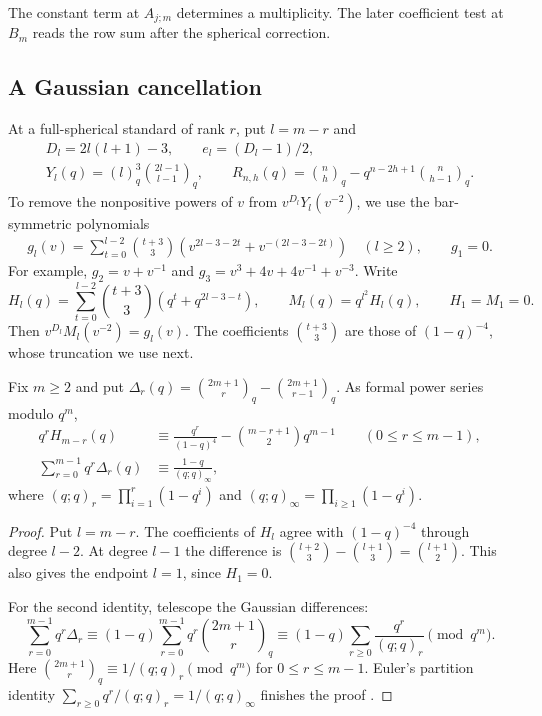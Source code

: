 \documentclass[a4paper,11pt]{amsart}
\numberwithin{equation}{subsection}
\theoremstyle{plain}
\theoremstyle{definition}
\theoremstyle{remark}
\newcommand{\gbinom}[2]{\binom{#1}{#2}}
\begin{document}
The constant term at $A_{j;m}$ determines a multiplicity.
The later coefficient test at $B_m$ reads the row sum after the
spherical correction.

\subsection{A Gaussian cancellation}

At a full-spherical standard of rank $r$, put $l=m-r$ and
\[
\begin{gathered}
D_l=2l(l+1)-3,\qquad e_l=(D_l-1)/2,\\
Y_l(q)=(l)_q^3\gbinom{2l-1}{l-1}_q,\qquad
R_{n,h}(q)=\gbinom{n}{h}_q-q^{n-2h+1}\gbinom{n}{h-1}_q.
\end{gathered}
\]
To remove the nonpositive powers of $v$ from
$v^{D_l}Y_l(v^{-2})$, we use the bar-symmetric polynomials
\begin{gather*}
g_l(v)=\sum_{t=0}^{l-2}\binom{t+3}{3}
\left(v^{2l-3-2t}+v^{-(2l-3-2t)}\right)\quad(l\ge2),
\qquad g_1=0.
\end{gather*}
For example, $g_2=v+v^{-1}$ and
$g_3=v^3+4v+4v^{-1}+v^{-3}$.
Write
\[
H_l(q)=\sum_{t=0}^{l-2}\binom{t+3}{3}
(q^t+q^{2l-3-t}),\qquad M_l(q)=q^{l^2}H_l(q),
\qquad H_1=M_1=0.
\]
Then $v^{D_l}M_l(v^{-2})=g_l(v)$. The coefficients
$\binom{t+3}{3}$ are those of $(1-q)^{-4}$, whose truncation we use next.

\begin{lemma}\label{lem:Gaussian-truncation}
Fix $m\ge2$ and put
$\Delta_r(q)=\gbinom{2m+1}{r}_q-\gbinom{2m+1}{r-1}_q$.
As formal power series modulo $q^m$,
\begin{align*}
q^rH_{m-r}(q)&\equiv\frac{q^r}{(1-q)^4}
-\binom{m-r+1}{2}q^{m-1}\qquad(0\le r\le m-1),\\
\sum_{r=0}^{m-1}q^r\Delta_r(q)&\equiv
\frac{1-q}{(q;q)_\infty},
\end{align*}
where $(q;q)_r=\prod_{i=1}^r(1-q^i)$ and
$(q;q)_\infty=\prod_{i\ge1}(1-q^i)$.
\end{lemma}

\begin{proof}
Put $l=m-r$. The coefficients of $H_l$ agree with
$(1-q)^{-4}$ through degree $l-2$. At degree $l-1$ the
difference is $\binom{l+2}{3}-\binom{l+1}{3}=\binom{l+1}{2}$.
This also gives the endpoint $l=1$, since $H_1=0$.

For the second identity, telescope the Gaussian differences:
\[
\sum_{r=0}^{m-1}q^r\Delta_r
\equiv(1-q)\sum_{r=0}^{m-1}q^r\gbinom{2m+1}{r}_q
\equiv(1-q)\sum_{r\ge0}\frac{q^r}{(q;q)_r}
\pmod{q^m}.
\]
Here $\gbinom{2m+1}{r}_q\equiv1/(q;q)_r\pmod{q^m}$ for
$0\le r\le m-1$. Euler's partition identity
$\sum_{r\ge0}q^r/(q;q)_r=1/(q;q)_\infty$ finishes the proof
\cite[Chapter~I, Section~2, Example~4]{Macdonald}.
\end{proof}
\end{document}
